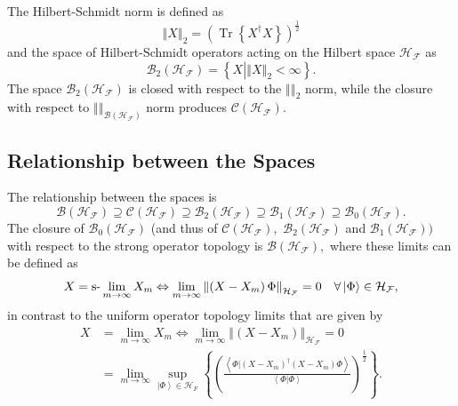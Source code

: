 \documentclass[aps,preprint,amsfonts,amssymb,showpacs,showkeys]{revtex4}%
\begin{document}
The Hilbert-Schmidt norm is defined as
\begin{equation}
\left\Vert X\right\Vert _{2}=\left(  \operatorname*{Tr}\left\{  X^{\dagger
}X\right\}  \right)  ^{\frac{1}{2}}%
\end{equation}
and the space of Hilbert-Schmidt operators acting on the Hilbert space
$\mathcal{H}_{\mathcal{F}}$ as
\begin{equation}
\mathcal{B}_{2}\left(  \mathcal{H}_{\mathcal{F}}\right)  =\left\{  X\left\vert
\left\Vert X\right\Vert _{2}<\infty\right.  \right\}  .
\end{equation}
The space $\mathcal{B}_{2}\left(  \mathcal{H}_{\mathcal{F}}\right)  $ is
closed with respect to the $\left\Vert {}\right\Vert _{2}$ norm, while the
closure with respect to $\left\Vert {}\right\Vert _{\mathcal{B}\left(
\mathcal{H}_{\mathcal{F}}\right)  }$ norm produces $\mathcal{C}\left(
\mathcal{H}_{\mathcal{F}}\right)  .$

\subsection{Relationship between the Spaces}

The relationship between the spaces is
\begin{equation}
\mathcal{B}\left(  \mathcal{H}_{\mathcal{F}}\right)  \supseteq\mathcal{C}%
\left(  \mathcal{H}_{\mathcal{F}}\right)  \supseteq\mathcal{B}_{2}\left(
\mathcal{H}_{\mathcal{F}}\right)  \supseteq\mathcal{B}_{1}\left(
\mathcal{H}_{\mathcal{F}}\right)  \supseteq\mathcal{B}_{0}\left(
\mathcal{H}_{\mathcal{F}}\right)  .
\end{equation}
The closure of $\mathcal{B}_{0}\left(  \mathcal{H}_{\mathcal{F}}\right)  $
(and thus of $\mathcal{C}\left(  \mathcal{H}_{\mathcal{F}}\right)  ,$
$\mathcal{B}_{2}\left(  \mathcal{H}_{\mathcal{F}}\right)  $ and $\mathcal{B}%
_{1}\left(  \mathcal{H}_{\mathcal{F}}\right)  )$ with respect to the strong
operator topology is $\mathcal{B}\left(  \mathcal{H}_{\mathcal{F}}\right)  ,$
where these limits can be defined as
\begin{equation}
X=\text{\textrm{s-}}\lim_{m\rightarrow\infty}X_{m}\Leftrightarrow
\lim_{m\rightarrow\infty}\left\Vert \left(  X-X_{m}\right)  \Phi\right\Vert
_{\mathcal{H}_{\mathcal{F}}}=0\quad\forall\left\vert \Phi\right\rangle
\in\mathcal{H}_{\mathcal{F}},
\end{equation}
in contrast to the uniform operator topology limits that are given by%
\begin{align}
X &  =\lim_{m\rightarrow\infty}X_{m}\Leftrightarrow\lim_{m\rightarrow\infty
}\left\Vert \left(  X-X_{m}\right)  \right\Vert _{\mathcal{H}_{\mathcal{F}}%
}=0\nonumber\\
&  =\lim_{m\rightarrow\infty}\sup_{\left\vert \Phi\right\rangle \in
\mathcal{H}_{F}}\left\{  \left(  \frac{\left\langle \left.  \Phi\right\vert
\left(  X-X_{m}\right)  ^{\dagger}\left(  X-X_{m}\right)  \Phi\right\rangle
}{\left\langle \left.  \Phi\right\vert \Phi\right\rangle }\right)  ^{\frac
{1}{2}}\right\}  .
\end{align}
\end{document}
